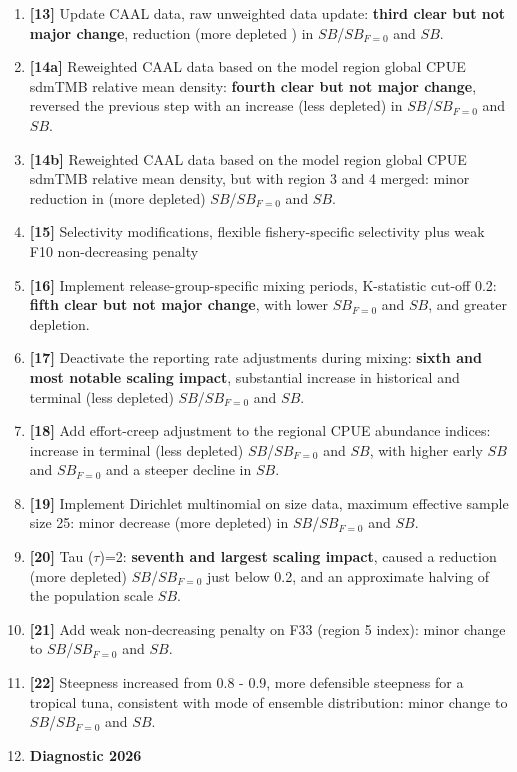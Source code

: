 \documentclass[
  english,
  a4paper,
  a4paper,
  11pt]{SCreport}
\begin{document}
\begin{enumerate}
  \(SB\)/\(SB_{F=0}\) or \(SB\).
\item
  \textbf{{[}13{]}} Update CAAL data, raw unweighted data update:
  \textbf{third clear but not major change}, reduction (more depleted )
  in \(SB\)/\(SB_{F=0}\) and \(SB\).
\item
  \textbf{{[}14a{]}} Reweighted CAAL data based on the model region
  global CPUE sdmTMB relative mean density: \textbf{fourth clear but not
  major change}, reversed the previous step with an increase (less
  depleted) in \(SB\)/\(SB_{F=0}\) and \(SB\).
\item
  \textbf{{[}14b{]}} Reweighted CAAL data based on the model region
  global CPUE sdmTMB relative mean density, but with region 3 and 4
  merged: minor reduction in (more depleted) \(SB\)/\(SB_{F=0}\) and
  \(SB\).
\item
  \textbf{{[}15{]}} Selectivity modifications, flexible fishery-specific
  selectivity plus weak F10 non-decreasing penalty
\item
  \textbf{{[}16{]}} Implement release-group-specific mixing periods,
  K-statistic cut-off 0.2: \textbf{fifth clear but not major change},
  with lower \(SB_{F=0}\) and \(SB\), and greater depletion.
\item
  \textbf{{[}17{]}} Deactivate the reporting rate adjustments during
  mixing: \textbf{sixth and most notable scaling impact}, substantial
  increase in historical and terminal (less depleted)
  \(SB\)/\(SB_{F=0}\) and \(SB\).
\item
  \textbf{{[}18{]}} Add effort-creep adjustment to the regional CPUE
  abundance indices: increase in terminal (less depleted)
  \(SB\)/\(SB_{F=0}\) and \(SB\), with higher early \(SB\) and
  \(SB_{F=0}\) and a steeper decline in \(SB\).
\item
  \textbf{{[}19{]}} Implement Dirichlet multinomial on size data,
  maximum effective sample size 25: minor decrease (more depleted) in
  \(SB\)/\(SB_{F=0}\) and \(SB\).
\item
  \textbf{{[}20{]}} Tau (\(\tau\))=2: \textbf{seventh and largest
  scaling impact}, caused a reduction (more depleted)
  \(SB\)/\(SB_{F=0}\) just below 0.2, and an approximate halving of the
  population scale \(SB\).
\item
  \textbf{{[}21{]}} Add weak non-decreasing penalty on F33 (region 5
  index): minor change to \(SB\)/\(SB_{F=0}\) and \(SB\).
\item
  \textbf{{[}22{]}} Steepness increased from 0.8 - 0.9, more defensible
  steepness for a tropical tuna, consistent with mode of ensemble
  distribution: minor change to \(SB\)/\(SB_{F=0}\) and \(SB\).
\item
  \textbf{Diagnostic 2026}
\end{enumerate}
\end{document}
